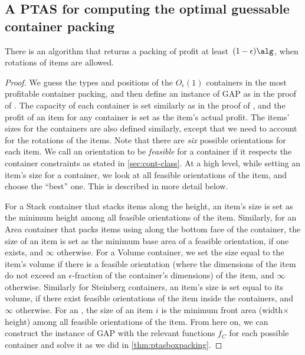 \subsection{A PTAS for computing the optimal guessable container packing}
\begin{lemma}
\label{lem:gapwithrotation}
    There is an algorithm that returns a packing of profit at least~$(1-\epsilon)\alg$, when rotations of items are allowed.
\end{lemma}
\begin{proof}
    We guess the types and positions of the $O_{\epsilon}(1)$ containers in the most profitable container packing, and then define an instance of GAP as in the proof of . The capacity of each container is set similarly as in the proof of , and the profit of an item for any container is set as the item's actual profit. The items' sizes for the containers are also defined similarly, except that we need to account for the rotations of the items. Note that there are {\em six}  possible orientations for each item. We call an orientation to be \textit{feasible} for a container if it respects the container constraints as stated in \cref{sec:cont-class}. At a high level, while setting an item's size for a container, we look at all feasible orientations of the item, and choose the ``best'' one. This is described in more detail below.

    For a Stack container that stacks items along the height, an item's size is set as the minimum height among all feasible orientations of the item. Similarly, for an Area container that packs items using \NFDH along the bottom face of the container, the size of an item is set as the minimum base area of a feasible orientation, if one exists, and $\infty$ otherwise. For a Volume container, we set the size equal to the item's volume if there is a feasible orientation (where the dimensions of the item do not exceed an $\epsilon$-fraction of the container's dimensions) of the item, and $\infty$ otherwise. Similarly for Steinberg containers, an item's size is set equal to its volume, if there exist feasible orientations of the item inside the containers, and $\infty$ otherwise.
    For an \LContainer{}, the size of an item $i$ is the minimum front area (width$\times$height) among all feasible orientations of the item. From here on, we can construct the instance of GAP with the relevant functions $f_C$ for each possible container and solve it as we did in \cref{thm:ptasboxpacking}.
\end{proof}
